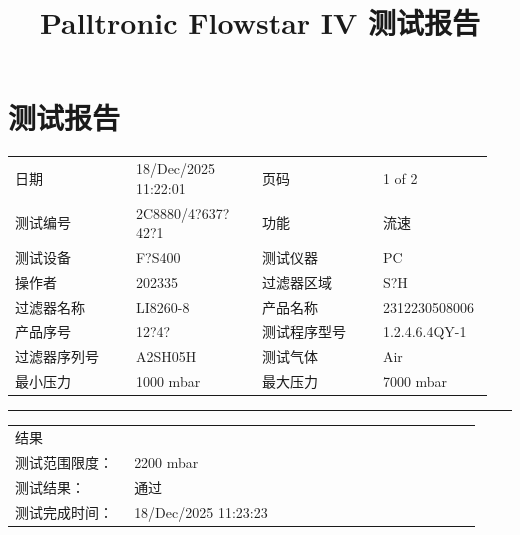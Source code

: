 \documentclass[UTF8,10pt,a4paper,fontset=fandol]{ctexart}
\newcommand{\fieldvalue}[1]{#1}
\begin{document}
\title{Palltronic Flowstar IV 测试报告}
\date{}
\maketitle

\section*{测试报告}

\begin{tabular}{@{}p{0.24\linewidth}p{0.25\linewidth}p{0.24\linewidth}p{0.22\linewidth}@{}}
日期 &
\fieldvalue{18/Dec/2025 11:22:01}
&
页码 &
\fieldvalue{1 of 2}
\\[0.25em]
测试编号 &
\fieldvalue{2C8880/4?637?42?1}
&
功能 &
\fieldvalue{流速}
\\
测试设备 &
\fieldvalue{F?S400}
&
测试仪器 &
\fieldvalue{PC}
\\
操作者 &
\fieldvalue{202335}
&
过滤器区域 &
\fieldvalue{S?H}
\\
过滤器名称 &
\fieldvalue{LI8260-8}
&
产品名称 &
\fieldvalue{2312230508006}
\\
产品序号 &
\fieldvalue{12?4?}
&
测试程序型号 &
\fieldvalue{1.2.4.6.4QY-1}
\\
过滤器序列号 &
\fieldvalue{A2SH05H}
&
测试气体 &
\fieldvalue{Air}
\\
最小压力 &
\fieldvalue{1000 mbar}
&
最大压力 &
\fieldvalue{7000 mbar}
\end{tabular}

\vspace{0.8em}
\hrule
\vspace{0.5em}

\begin{tabular}{@{}p{0.24\linewidth}p{0.70\linewidth}@{}}
结果 &
\\
测试范围限度：&
\fieldvalue{2200 mbar}
\\
测试结果：&
\fieldvalue{通过}
\\
测试完成时间：&
\fieldvalue{18/Dec/2025 11:23:23}
\end{tabular}
\end{document}
